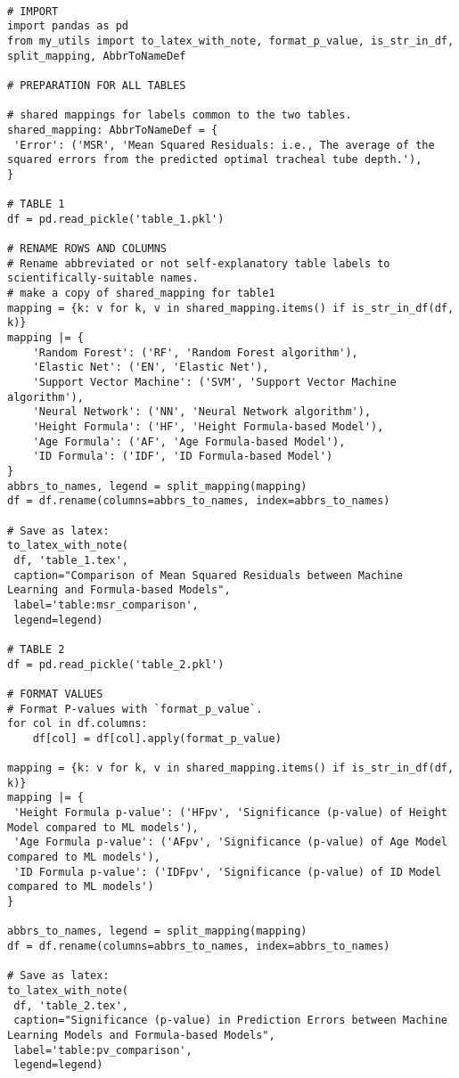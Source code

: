 \documentclass[11pt]{article}
\begin{document}
\begin{verbatim}

# IMPORT
import pandas as pd
from my_utils import to_latex_with_note, format_p_value, is_str_in_df, split_mapping, AbbrToNameDef

# PREPARATION FOR ALL TABLES

# shared mappings for labels common to the two tables.
shared_mapping: AbbrToNameDef = {
 'Error': ('MSR', 'Mean Squared Residuals: i.e., The average of the squared errors from the predicted optimal tracheal tube depth.'),
}

# TABLE 1
df = pd.read_pickle('table_1.pkl')

# RENAME ROWS AND COLUMNS
# Rename abbreviated or not self-explanatory table labels to scientifically-suitable names.
# make a copy of shared_mapping for table1
mapping = {k: v for k, v in shared_mapping.items() if is_str_in_df(df, k)}
mapping |= {
    'Random Forest': ('RF', 'Random Forest algorithm'),
    'Elastic Net': ('EN', 'Elastic Net'),
    'Support Vector Machine': ('SVM', 'Support Vector Machine algorithm'),
    'Neural Network': ('NN', 'Neural Network algorithm'),
    'Height Formula': ('HF', 'Height Formula-based Model'),
    'Age Formula': ('AF', 'Age Formula-based Model'),
    'ID Formula': ('IDF', 'ID Formula-based Model')
}
abbrs_to_names, legend = split_mapping(mapping)
df = df.rename(columns=abbrs_to_names, index=abbrs_to_names)

# Save as latex:
to_latex_with_note(
 df, 'table_1.tex',
 caption="Comparison of Mean Squared Residuals between Machine Learning and Formula-based Models", 
 label='table:msr_comparison',
 legend=legend)

# TABLE 2
df = pd.read_pickle('table_2.pkl')

# FORMAT VALUES
# Format P-values with `format_p_value`.
for col in df.columns:
    df[col] = df[col].apply(format_p_value)

mapping = {k: v for k, v in shared_mapping.items() if is_str_in_df(df, k)}
mapping |= {
 'Height Formula p-value': ('HFpv', 'Significance (p-value) of Height Model compared to ML models'),
 'Age Formula p-value': ('AFpv', 'Significance (p-value) of Age Model compared to ML models'),
 'ID Formula p-value': ('IDFpv', 'Significance (p-value) of ID Model compared to ML models')
}

abbrs_to_names, legend = split_mapping(mapping)
df = df.rename(columns=abbrs_to_names, index=abbrs_to_names)

# Save as latex:
to_latex_with_note(
 df, 'table_2.tex',
 caption="Significance (p-value) in Prediction Errors between Machine Learning Models and Formula-based Models", 
 label='table:pv_comparison',
 legend=legend)

\end{verbatim}
\end{document}
